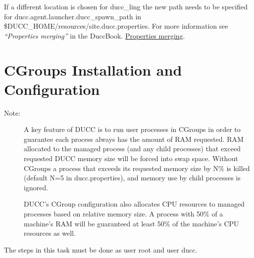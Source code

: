 If a different location is chosen for ducc\_ling the new path needs to be specified 
for ducc.agent.launcher.ducc\_spawn\_path in \$DUCC\_HOME/resources/site.ducc.properties.
For more information see
\ifdefined\DUCCSTANDALONE
{\em ``Properties merging''} in the DuccBook. 
\else
\hyperref[sec:admin.properties-merge] {Properties merging}. 
\fi


\section{CGroups Installation and Configuration}

\begin{description}
    \item[Note:] A key feature of DUCC is to run user processes in CGroups in order to guarantee
      each process always has the amount of RAM requested. RAM allocated to the managed process
      (and any child processes) that exceed requested DUCC memory size will be forced into swap space. 
      Without CGroups a process that exceeds its requested memory size by N\% is killed 
      (default N=5 in ducc.properties), and memory use by child processes is ignored.
      
      DUCC's CGroup configuration also allocates CPU resources to managed processes based on
      relative memory size. A process with 50\% of a machine's RAM will be guaranteed at least
      50\% of the machine's CPU resources as well. 
\end{description}

    The steps in this task must be done as user root and user ducc.

